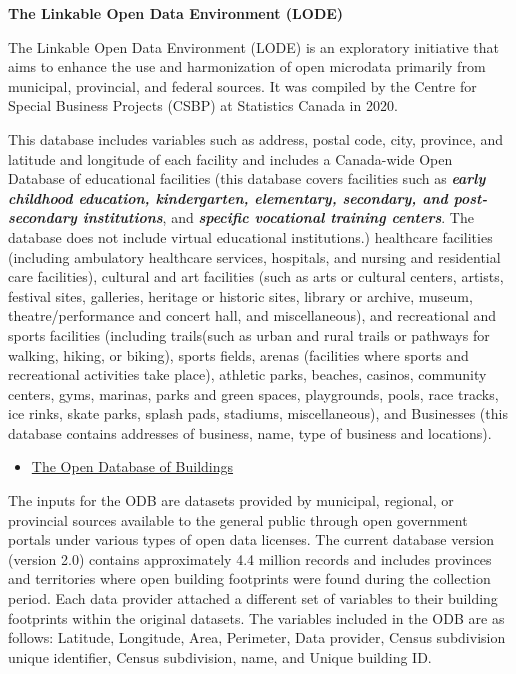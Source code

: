 \documentclass[
11pt, %
oneside, %
english, %
singlespacing, %
]{macthesis} %
\def\tightlist{}
\begin{document}
\textbf{The Linkable Open Data Environment (LODE)}

The Linkable Open Data Environment (LODE) is an exploratory initiative that aims to enhance the use and harmonization of open microdata primarily from municipal, provincial, and federal sources. It was compiled by the Centre for Special Business Projects (CSBP) at Statistics Canada in 2020.

This database includes variables such as address, postal code, city, province, and latitude and longitude of each facility and includes a Canada-wide Open Database of educational facilities (this database covers facilities such as \textbf{\emph{early childhood education, kindergarten, elementary, secondary, and post-secondary institutions}}, and \textbf{\emph{specific vocational training centers}}. The database does not include virtual educational institutions.) healthcare facilities (including ambulatory healthcare services, hospitals, and nursing and residential care facilities), cultural and art facilities (such as arts or cultural centers, artists, festival sites, galleries, heritage or historic sites, library or archive, museum, theatre/performance and concert hall, and miscellaneous), and recreational and sports facilities (including trails(such as urban and rural trails or pathways for walking, hiking, or biking), sports fields, arenas (facilities where sports and recreational activities take place), athletic parks, beaches, casinos, community centers, gyms, marinas, parks and green spaces, playgrounds, pools, race tracks, ice rinks, skate parks, splash pads, stadiums, miscellaneous), and Businesses (this database contains addresses of business, name, type of business and locations).

\begin{itemize}
\tightlist
\item
  \href{https://www.statcan.gc.ca/en/lode/databases/odb}{The Open Database of Buildings}
\end{itemize}

The inputs for the ODB are datasets provided by municipal, regional, or provincial sources available to the general public through open government portals under various types of open data licenses. The current database version (version 2.0) contains approximately 4.4 million records and includes provinces and territories where open building footprints were found during the collection period. Each data provider attached a different set of variables to their building footprints within the original datasets. The variables included in the ODB are as follows: Latitude, Longitude, Area, Perimeter, Data provider, Census subdivision unique identifier, Census subdivision, name, and Unique building ID.
\end{document}
